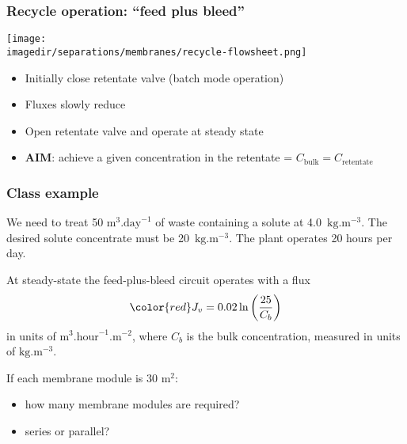 \begin{frame}\frametitle{Recycle operation: ``feed plus bleed''}
	\begin{center}
		\texttt{[image: \\imagedir/separations/membranes/recycle-flowsheet.png]}
	\end{center}
	\begin{itemize}
		\item	Initially close retentate valve (batch mode operation)
		\item	Fluxes slowly reduce
		\item	Open retentate valve and operate at steady state
		\item	\textbf{AIM}: achieve a given concentration in the retentate = $C_\text{bulk} = C_\text{retentate}$
	\end{itemize}
\end{frame}

\begin{frame}\frametitle{Class example}
	We need to treat 50 $\text{m}^3\text{.day}^{-1}$ of waste containing a solute at 4.0~$\text{kg}\text{.m}^{-3}$. The desired solute concentrate must be 20~$\text{kg}\text{.m}^{-3}$. The plant operates 20 hours per day.

	\vspace{12pt}
	At steady-state the feed-plus-bleed circuit operates with a flux
	\[
		{\color{red}J_v} = 0.02 \ln \left(\frac{25}{C_b} \right)
	\]
	in units of $\text{m}^3.\text{hour}^{-1}.\text{m}^{-2}$, where $C_b$ is the bulk concentration, measured in units of $\text{kg}\text{.m}^{-3}$.

	\vspace{12pt}
	If each membrane module is 30 m$^2$:
	\begin{itemize}
		\item	how many membrane modules are required?
		\item	series or parallel?
	\end{itemize}
\end{frame}

